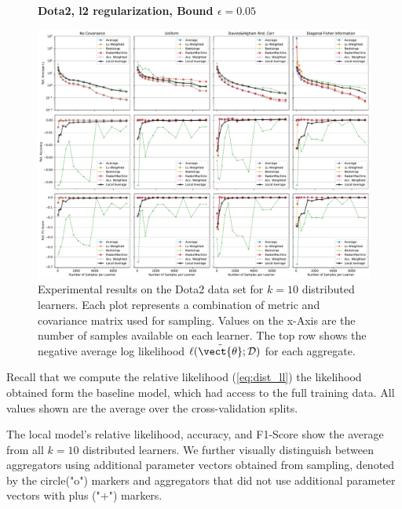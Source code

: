     \begin{landscape}
        \begin{figure}
            \centering
            \textbf{Dota2, l2 regularization, Bound $\epsilon=0.05$}\par\medskip
            \includegraphics[height=\dimexpr \textheight - 1\baselineskip\relax]{kapitel/figures/dota2_l2_0.05_neg_relative.pdf}
            \caption[Dota2 plots with l2 regularization and $\epsilon=0.05$]{Experimental results on the Dota2 data set for $k=10$ distributed learners. Each plot represents a combination of metric and covariance matrix used for sampling. Values on the x-Axis are the number of samples available on each learner. The top row shows the negative average log likelihood $\ell(\tilde{\vect{\theta}}; \mathcal{D})$ for each aggregate.}
            \label{fig:analysis3}
        \end{figure}
    \end{landscape}

Recall that we compute the relative likelihood (\autoref{eq:dist_ll}) \wrt the likelihood obtained form the baseline model, which had access to the full training data.
All values shown are the average over the cross-validation splits.

The local model's relative likelihood, accuracy, and F1-Score show the average from all $k=10$ distributed learners.
We further visually distinguish between aggregators using additional parameter vectors obtained from sampling, denoted by the circle("o") markers and aggregators that did not use additional parameter vectors with plus ("+") markers.

